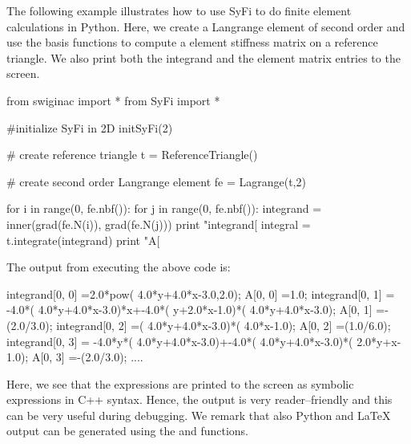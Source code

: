 The following example illustrates how to use SyFi to do finite element calculations in Python. 
Here, we create a Langrange element of second order and use the basis functions to compute a 
element stiffness matrix on a reference triangle. We also print both the integrand and 
the element matrix entries to the screen. 
\begin{python}
from swiginac import *
from SyFi import * 

#initialize SyFi in 2D
initSyFi(2)

# create reference triangle 
t = ReferenceTriangle() 

# create second order Langrange element
fe = Lagrange(t,2)

for i in range(0, fe.nbf()):
    for j in range(0, fe.nbf()):
        integrand = inner(grad(fe.N(i)), grad(fe.N(j)))
        print "integrand[%
        integral = t.integrate(integrand) 
        print "A[%
\end{python}
The output from executing the above code is: 
\begin{c++}
integrand[0, 0]  =2.0*pow( 4.0*y+4.0*x-3.0,2.0);
A[0, 0]          =1.0;
integrand[0, 1]  = -4.0*( 4.0*y+4.0*x-3.0)*x+-4.0*( y+2.0*x-1.0)*( 4.0*y+4.0*x-3.0);
A[0, 1]          =-(2.0/3.0);
integrand[0, 2]  =( 4.0*y+4.0*x-3.0)*( 4.0*x-1.0);
A[0, 2]          =(1.0/6.0);
integrand[0, 3]  = -4.0*y*( 4.0*y+4.0*x-3.0)+-4.0*( 4.0*y+4.0*x-3.0)*( 2.0*y+x-1.0);
A[0, 3]          =-(2.0/3.0);
....
\end{c++}
Here, we see that the expressions are printed to the screen as symbolic expressions
in C++ syntax. Hence, the output is very reader--friendly and this can be very useful during debugging.  
We remark that also Python and LaTeX output can be generated using the  and  functions. 

